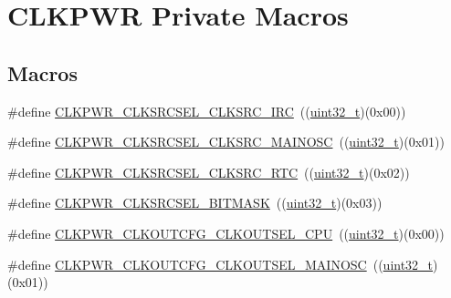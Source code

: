 \hypertarget{group___c_l_k_p_w_r___private___macros}{}\section{C\+L\+K\+P\+WR Private Macros}
\label{group___c_l_k_p_w_r___private___macros}
\subsection*{Macros}
\begin{DoxyCompactItemize}
\item 
\#define \hyperlink{group___c_l_k_p_w_r___private___macros_ga17bbb33d14958fbed34f56543569761f}{C\+L\+K\+P\+W\+R\+\_\+\+C\+L\+K\+S\+R\+C\+S\+E\+L\+\_\+\+C\+L\+K\+S\+R\+C\+\_\+\+I\+RC}~((\hyperlink{_p_e___types_8h_a33594304e786b158f3fb30289278f5af}{uint32\+\_\+t})(0x00))
\item 
\#define \hyperlink{group___c_l_k_p_w_r___private___macros_gad70f480a8a233255b43c7d267bc80e3c}{C\+L\+K\+P\+W\+R\+\_\+\+C\+L\+K\+S\+R\+C\+S\+E\+L\+\_\+\+C\+L\+K\+S\+R\+C\+\_\+\+M\+A\+I\+N\+O\+SC}~((\hyperlink{_p_e___types_8h_a33594304e786b158f3fb30289278f5af}{uint32\+\_\+t})(0x01))
\item 
\#define \hyperlink{group___c_l_k_p_w_r___private___macros_gabd68dae444cd4872b7be3ebb892ea040}{C\+L\+K\+P\+W\+R\+\_\+\+C\+L\+K\+S\+R\+C\+S\+E\+L\+\_\+\+C\+L\+K\+S\+R\+C\+\_\+\+R\+TC}~((\hyperlink{_p_e___types_8h_a33594304e786b158f3fb30289278f5af}{uint32\+\_\+t})(0x02))
\item 
\#define \hyperlink{group___c_l_k_p_w_r___private___macros_ga2c8c3a97560e3bccac1748705f248d3f}{C\+L\+K\+P\+W\+R\+\_\+\+C\+L\+K\+S\+R\+C\+S\+E\+L\+\_\+\+B\+I\+T\+M\+A\+SK}~((\hyperlink{_p_e___types_8h_a33594304e786b158f3fb30289278f5af}{uint32\+\_\+t})(0x03))
\item 
\#define \hyperlink{group___c_l_k_p_w_r___private___macros_ga7980ec0f7e1a786891171aa2d8f7d5e7}{C\+L\+K\+P\+W\+R\+\_\+\+C\+L\+K\+O\+U\+T\+C\+F\+G\+\_\+\+C\+L\+K\+O\+U\+T\+S\+E\+L\+\_\+\+C\+PU}~((\hyperlink{_p_e___types_8h_a33594304e786b158f3fb30289278f5af}{uint32\+\_\+t})(0x00))
\item 
\#define \hyperlink{group___c_l_k_p_w_r___private___macros_gafec039a8373541201b0390cc8112ae6a}{C\+L\+K\+P\+W\+R\+\_\+\+C\+L\+K\+O\+U\+T\+C\+F\+G\+\_\+\+C\+L\+K\+O\+U\+T\+S\+E\+L\+\_\+\+M\+A\+I\+N\+O\+SC}~((\hyperlink{_p_e___types_8h_a33594304e786b158f3fb30289278f5af}{uint32\+\_\+t})(0x01))
\item 

\end{DoxyCompactItemize}
